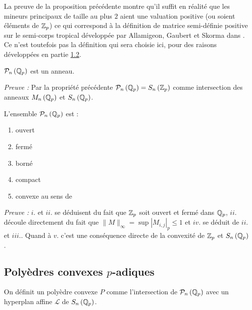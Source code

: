 \hfill \qedsymbol
\begin{remarque}
	
	La preuve de la proposition précédente montre qu'il suffit en réalité que les mineurs principaux de taille au plus $2$ aient une valuation positive (ou soient éléments de $ \mathbb {Z}_p $) ce qui correspond à la définition de matrice semi-définie positive sur le semi-corps tropical développée par Allamigeon, Gaubert et Skorma dans \cite{allamigeon_tropical_2020} . Ce n'est toutefois pas la définition qui sera choisie ici, pour des raisons développées en partie \hyperlink{subsection.1.2}{1.2}.
\end{remarque}

\begin{propriete}
	$\mathcal{P}_n \left( \mathbb{Q}_p \right)$ est un anneau.
\end{propriete}

\textit{Preuve :} Par la propriété précédente $\mathcal{P}_n \left( \mathbb{Q}_p \right) = S_n \left(  \mathbb {Z}_p  \right)$ comme intersection des anneaux $M_n \left( \mathbb{Q}_p \right)$ et $S_n\left( \mathbb{Q}_p \right) $.
\begin{propriete}
	L'ensemble $\mathcal{P}_n \left( \mathbb{Q}_p \right)$ est :
	\begin{enumerate}[label=\roman*.]
	\item ouvert
	\item fermé
	\item borné
	\item compact
	\item convexe au sens de \parencite{monna_mo58_1958}  
\end{enumerate}
\end{propriete}
\textit{Preuve :}
$i.$ et $ii.$ se déduisent du fait que $ \mathbb {Z}_p $ soit ouvert et fermé dans $\mathbb{Q}_p$, $ii.$ découle directement du fait que $\|M\|_\infty = \sup |M_{i,j}|_p \le 1$ et $iv.$ se déduit de $ii.$ et $iii.$.
Quand à $v.$ c'est une conséquence directe de la convexité de $ \mathbb {Z}_p $ et $S_n\left( \mathbb{Q}_p \right) $.


\subsection{Polyèdres convexes \texorpdfstring{$p$}{p}-adiques} 


\begin{definition}
	
On définit un polyèdre convexe $P$ comme l'intersection de $\mathcal{P}_n \left( \mathbb{Q}_p \right)$ avec un hyperplan affine $\mathcal{L} $ de $S_n\left( \mathbb{Q}_p \right) $. 
\end{definition}

